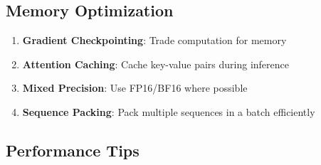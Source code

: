 \documentclass[11pt]{article}
\begin{document}
\subsection{Memory Optimization}

\begin{enumerate}
    \item \textbf{Gradient Checkpointing}: Trade computation for memory
    \item \textbf{Attention Caching}: Cache key-value pairs during inference
    \item \textbf{Mixed Precision}: Use FP16/BF16 where possible
    \item \textbf{Sequence Packing}: Pack multiple sequences in a batch efficiently
\end{enumerate}

\subsection{Performance Tips}
\end{document}
